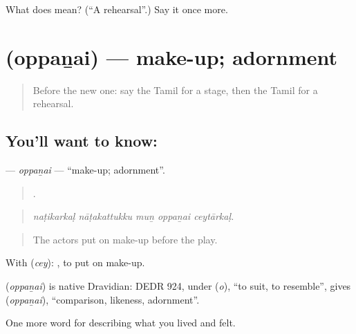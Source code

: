 \begin{tcolorbox}[breakable,colback=teal!4,colframe=teal!35!black,title={Before you move on}]
What does  mean? (\textquotedblleft{}A rehearsal\textquotedblright{}.) Say it once more.
\end{tcolorbox}
\section[\texorpdfstring{\ta{ஒப்பனை} (oppaṉai)}{ஒப்பனை (oppaṉai)}]{ (oppaṉai) — make-up; adornment}

\label{lesson:TA-C540-oppanai}



\begin{quote}
Before the new one: say the Tamil for a stage, then the Tamil for a rehearsal.
\end{quote}

\subsection*{You'll want to know: }
\textbf{} — \emph{oppaṉai} — \textquotedblleft{}make-up; adornment\textquotedblright{}.

\begin{quote}
    .
\end{quote}

\begin{quote}
\emph{naṭikarkaḷ nāṭakattukku muṉ oppaṉai ceytārkaḷ.}
\end{quote}

\begin{quote}
The actors put on make-up before the play.
\end{quote}

With  (\emph{cey}):  , to put on make-up.

\begin{cousinweb}
\textbf{} (\emph{oppaṉai}) is native Dravidian: DEDR 924, under  (\emph{o}), \textquotedblleft{}to suit, to resemble\textquotedblright{}, gives  (\emph{oppaṉai}), \textquotedblleft{}comparison, likeness, adornment\textquotedblright{}.
\end{cousinweb}

\begin{grammarlens}[title={What you've built}]
One more word for describing what you lived and felt.
\end{grammarlens}

